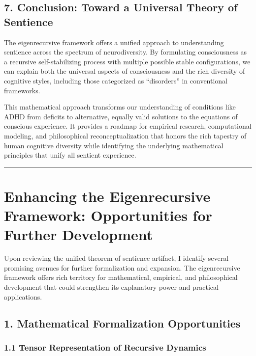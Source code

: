 \documentclass[
]{article}
\begin{document}
\subsection{7. Conclusion: Toward a Universal Theory of
Sentience}\label{conclusion-toward-a-universal-theory-of-sentience}

The eigenrecursive framework offers a unified approach to understanding
sentience across the spectrum of neurodiversity. By formulating
consciousness as a recursive self-stabilizing process with multiple
possible stable configurations, we can explain both the universal
aspects of consciousness and the rich diversity of cognitive styles,
including those categorized as ``disorders'' in conventional frameworks.

This mathematical approach transforms our understanding of conditions
like ADHD from deficits to alternative, equally valid solutions to the
equations of conscious experience. It provides a roadmap for empirical
research, computational modeling, and philosophical reconceptualization
that honors the rich tapestry of human cognitive diversity while
identifying the underlying mathematical principles that unify all
sentient experience.

\begin{center}\rule{0.5\linewidth}{0.5pt}\end{center}

\section{Enhancing the Eigenrecursive Framework: Opportunities for
Further
Development}\label{enhancing-the-eigenrecursive-framework-opportunities-for-further-development}

Upon reviewing the unified theorem of sentience artifact, I identify
several promising avenues for further formalization and expansion. The
eigenrecursive framework offers rich territory for mathematical,
empirical, and philosophical development that could strengthen its
explanatory power and practical applications.

\subsection{1. Mathematical Formalization
Opportunities}\label{mathematical-formalization-opportunities}

\subsubsection{1.1 Tensor Representation of Recursive
Dynamics}\label{tensor-representation-of-recursive-dynamics}
\end{document}
